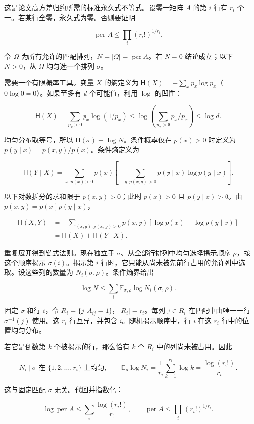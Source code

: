 \documentclass[11pt,a4paper]{article}
\begin{document}
这是论文高方差归约所需的标准永久式不等式。设零一矩阵 \(A\) 的第 \(i\) 行有 \(r_i\) 个一。若某行全零，永久式为零。否则要证明

\[\operatorname{per}A\le\prod_i(r_i!)^{1/r_i}.\]

令 \(\Omega\) 为所有允许的匹配排列，\(N=|\Omega|=\operatorname{per}A\)。若 \(N=0\) 结论成立；以下 \(N>0\)，从 \(\Omega\) 均匀选一个排列 \(\sigma\)。

需要一个有限概率工具。变量 \(X\) 的熵定义为 \(\mathsf H(X)=-\sum_xp_x\log p_x\)（\(0\log0=0\)）。如果至多有 \(d\) 个可能值，利用 \(\log\) 的凹性：

\[\mathsf H(X)=\sum_{p_x>0}p_x\log(1/p_x)
\le\log\left(\sum_{p_x>0}p_x/p_x\right)\le\log d.\]

均匀分布取等号，所以 \(\mathsf H(\sigma)=\log N\)。条件概率仅在 \(p(x)>0\) 时定义为 \(p(y\mid x)=p(x,y)/p(x)\)。条件熵定义为

\[\mathsf H(Y\mid X)=\sum_{x:p(x)>0}p(x)
\left[-\sum_{y:p(x,y)>0}p(y\mid x)\log p(y\mid x)\right].\]

以下对数拆分的求和限于 \(p(x,y)>0\)；此时 \(p(x)>0\) 且 \(p(y\mid x)>0\)。由 \(p(x,y)=p(x)p(y\mid x)\)，

\[\begin{aligned}
\mathsf H(X,Y)&=-\sum_{(x,y):p(x,y)>0}p(x,y)[\log p(x)+\log p(y\mid x)]\\
&=\mathsf H(X)+\mathsf H(Y\mid X).
\end{aligned}\]

重复展开得到链式法则。现在独立于 \(\sigma\)、从全部行排列中均匀选择揭示顺序 \(\rho\)，按这个顺序揭示 \(\sigma(i)\)。揭示第 \(i\) 行时，它只能从尚未被先前行占用的允许列中选取。设这些列的数量为 \(N_i(\sigma,\rho)\)。条件熵界给出

\[\log N\le\sum_i\mathbb E_{\sigma,\rho}\log N_i(\sigma,\rho).\]

固定 \(\sigma\) 和行 \(i\)，令 \(R_i=\{j:A_{ij}=1\}\)，\(|R_i|=r_i\)。每列 \(j\in R_i\) 在匹配中由唯一一行 \(\sigma^{-1}(j)\) 使用。这 \(r_i\) 行互异，并包含 \(i\)。随机揭示顺序中，行 \(i\) 在这 \(r_i\) 行中的位置均匀分布。

若它是倒数第 \(k\) 个被揭示的行，那么恰有 \(k\) 个 \(R_i\) 中的列尚未被占用。因此

\[N_i\mid\sigma\text{ 在 }\{1,2,\ldots,r_i\}\text{ 上均匀},\qquad
\mathbb E_\rho\log N_i=\frac1{r_i}\sum_{k=1}^{r_i}\log k=\frac{\log(r_i!)}{r_i}.\]

这与固定匹配 \(\sigma\) 无关。代回并指数化：

\[\log\operatorname{per}A\le\sum_i\frac{\log(r_i!)}{r_i},\qquad
\operatorname{per}A\le\prod_i(r_i!)^{1/r_i}.\]
\end{document}
